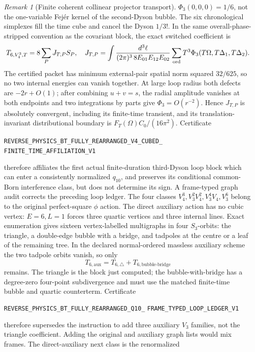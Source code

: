 \documentclass[11pt]{article}
\theoremstyle{definition}
\theoremstyle{remark}
\newtheorem{remark}[theorem]{Remark}
\begin{document}
\begin{remark}[Finite coherent collinear projector transport]
$\Phi_3(0,0,0)=1/6$, not the one-variable Fej\'er kernel of the second-Dyson
bubble.  The six chronological simplexes fill the time cube and cancel the
Dyson $1/3!$.  In the same overall-phase-stripped convention as the
covariant block, the exact switched coefficient is
\[
 T_{6,V_4^3,T}=8\sum_P J_{T,P}S_P,
 \quad
 J_{T,P}=\int{d^3\ell\over(2\pi)^3\,8E_{01}E_{12}E_{02}}
 \sum_{\mathrm{ord}}T^3\Phi_3(T\Omega,T\Delta_1,T\Delta_2).
\]
The certified packet has minimum external-pair spatial norm squared
$32/625$, so no two internal energies can vanish together.  At large loop
radius both defects are $-2r+O(1)$; after combining $u+v=s$, the radial
amplitude vanishes at both endpoints and two integrations by parts give
$\Phi_3=O(r^{-2})$.  Hence $J_{T,P}$ is absolutely convergent, including its
finite-time transient, and its translation-invariant distributional boundary
is $F_T(\Omega)C_0/(16\pi^2)$.  Certificate
\par\noindent
\texttt{REVERSE\_PHYSICS\_BT\_FULLY\_REARRANGED\_V4\_CUBED\_}
\allowbreak\texttt{FINITE\_TIME\_AFFILIATION\_V1}
\par\noindent
therefore affiliates the first actual finite-duration third-Dyson loop block
which can enter a consistently normalized $q_{10}$, and preserves its
conditional common-Born interference class, but does not determine its sign.
A frame-typed graph audit corrects the preceding loop ledger.  The four
classes $V_4^3,V_3^2V_4^2,V_3^4V_4,V_3^6$ belong to the original
perfect-square $\phi$ action.  The direct auxiliary action has no cubic
vertex: $E=6,L=1$ forces three quartic vertices and three internal lines.
Exact enumeration gives sixteen vertex-labelled multigraphs in four
$S_3$-orbits: the triangle, a double-edge bubble with a bridge, and tadpoles
at the centre or a leaf of the remaining tree.  In the declared
normal-ordered massless auxiliary scheme the two tadpole orbits vanish, so
only
\[
 T_{6,\mathrm{aux}}=T_{6,\triangle}
 +T_{6,\mathrm{bubble\mbox{-}bridge}}
\]
remains.  The triangle is the block just computed; the bubble-with-bridge has
a degree-zero four-point subdivergence and must use the matched finite-time
bubble and quartic counterterm.  Certificate
\par\noindent
\texttt{REVERSE\_PHYSICS\_BT\_FULLY\_REARRANGED\_Q10\_}
\allowbreak\texttt{FRAME\_TYPED\_LOOP\_LEDGER\_V1}
\par\noindent
therefore supersedes the instruction to add three auxiliary $V_3$ families,
not the triangle coefficient.  Adding the original and auxiliary graph lists
would mix frames.  The direct-auxiliary next class is the renormalized

\end{remark}
\end{document}
